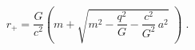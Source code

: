 \begin{equation} \label{eqp3} 
r_{+} = \frac{G}{c^2} \left( m + \sqrt{m^2 - \frac{q^2}{G}  -
\frac{c^2}{G^2} \, a^2} \,\, \right) \; .
\end{equation} 
